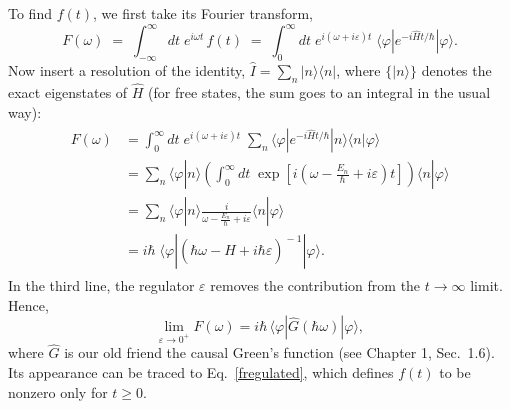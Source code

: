 \documentclass[prx,12pt]{revtex4-2}
\begin{document}
To find $f(t)$, we first take its Fourier transform,
\begin{equation}
  F(\omega) \;=\; \int_{-\infty}^\infty dt \; e^{i\omega t}\, f(t) \;=\; \int_0^\infty dt \; e^{i(\omega + i\varepsilon) t} \; \langle\varphi|e^{-i\hat{H}t/\hbar}|\varphi\rangle.
\end{equation}
Now insert a resolution of the identity, $\hat{I} = \sum_n
|n\rangle\langle n|$, where $\{|n\rangle\}$ denotes the exact
eigenstates of $\hat{H}$ (for free states, the sum goes to an integral
in the usual way):
\begin{align}
  \begin{aligned}F(\omega) &= \int_0^\infty dt \; e^{i(\omega + i\varepsilon) t} \; \sum_n \langle\varphi|e^{-i\hat{H}t/\hbar}|n\rangle\langle n|\varphi\rangle \\ &= \sum_n \langle\varphi|n\rangle \left( \int_0^\infty dt \; \exp\left[i\left(\omega - \frac{E_n}{\hbar} + i\varepsilon\right) t\right] \right) \langle n|\varphi\rangle \\ &= \sum_n \langle\varphi|n\rangle \frac{i}{\omega - \frac{E_n}{\hbar} + i \varepsilon} \langle n|\varphi\rangle \\ &= i \hbar\; \langle \varphi | \left(\hbar\omega - \hat{H} + i\hbar\varepsilon \right)^{\!-1} | \varphi\rangle. \end{aligned}
\end{align}
In the third line, the regulator $\varepsilon$ removes the
contribution from the $t \rightarrow\infty$ limit.  Hence,
\begin{equation}
  \lim_{\varepsilon \rightarrow 0^+} F(\omega) = i \hbar \, \langle \varphi | \hat{G}(\hbar\omega) | \varphi\rangle,
\end{equation}
where $\hat{G}$ is our old friend the causal Green's function (see
Chapter 1, Sec.~1.6).  Its appearance can be traced to
Eq.~\eqref{fregulated}, which defines $f(t)$ to be nonzero only for $t
\ge 0$.
\end{document}
